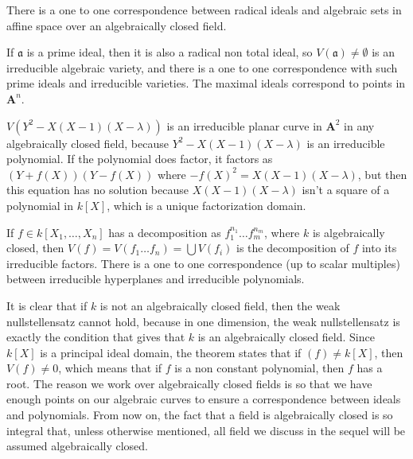 \begin{corollary}
    There is a one to one correspondence between radical ideals and algebraic sets in affine space over an algebraically closed field.
\end{corollary}

\begin{corollary}
    If $\mathfrak{a}$ is a prime ideal, then it is also a radical non total ideal, so $V(\mathfrak{a}) \neq \emptyset$ is an irreducible algebraic variety, and there is a one to one correspondence with such prime ideals and irreducible varieties. The maximal ideals correspond to points in $\mathbf{A}^n$.
\end{corollary}

\begin{example}
    $V(Y^2 - X(X-1)(X-\lambda))$ is an irreducible planar curve in $\mathbf{A}^2$ in any algebraically closed field, because $Y^2 - X(X-1)(X-\lambda)$ is an irreducible polynomial. If the polynomial does factor, it factors as $(Y + f(X))(Y - f(X))$ where $-f(X)^2 = X(X-1)(X-\lambda)$, but then this equation has no solution because $X(X-1)(X-\lambda)$ isn't a square of a polynomial in $k[X]$, which is a unique factorization domain.
\end{example}

\begin{corollary}
    If $f \in k[X_1, \dots, X_n]$ has a decomposition as $f_1^{n_1} \dots f_m^{n_m}$, where $k$ is algebraically closed, then $V(f) = V(f_1 \dots f_n) = \bigcup V(f_i)$ is the decomposition of $f$ into its irreducible factors. There is a one to one correspondence (up to scalar multiples) between irreducible hyperplanes and irreducible polynomials.
\end{corollary}

It is clear that if $k$ is not an algebraically closed field, then the weak nullstellensatz cannot hold, because in one dimension, the weak nullstellensatz is exactly the condition that gives that $k$ is an algebraically closed field. Since $k[X]$ is a principal ideal domain, the theorem states that if $(f) \neq k[X]$, then $V(f) \neq 0$, which means that if $f$ is a non constant polynomial, then $f$ has a root.  The reason we work over algebraically closed fields is so that we have enough points on our algebraic curves to ensure a correspondence between ideals and polynomials. From now on, the fact that a field is algebraically closed is so integral that, unless otherwise mentioned, all field we discuss in the sequel will be assumed algebraically closed.

